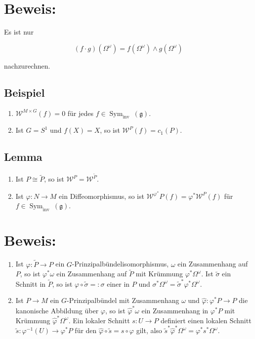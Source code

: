 \documentclass[10pt, letterpaper]{article}
\begin{document}
\section*{Beweis:}
Es ist nur

$$
(f \cdot g)\left(\Omega^{\omega}\right)=f\left(\Omega^{\omega}\right) \wedge g\left(\Omega^{\omega}\right)
$$

nachzurechnen.

\subsection*{Beispiel}
\begin{enumerate}
  \item $\mathcal{W}^{M \times G}(f)=0$ für jedes $f \in \operatorname{Sym}_{\text {inv }}(\mathfrak{g})$.
  \item Ist $G=S^{1}$ und $f(X)=X$, so ist $\mathcal{W}^{P}(f)=c_{1}(P)$.
\end{enumerate}

\subsection*{Lemma}
\begin{enumerate}
  \item Ist $P \cong \tilde{P}$, so ist $\mathcal{W}^{P}=\mathcal{W}^{\tilde{P}}$.
  \item Ist $\varphi: N \rightarrow M$ ein Diffeomorphismus, so ist $\mathcal{W}^{\varphi^{*}} P(f)=\varphi^{*} \mathcal{W}^{P}(f)$ für $f \in \operatorname{Sym}_{\text {inv }}(\mathfrak{g})$.
\end{enumerate}

\section*{Beweis:}
\begin{enumerate}
  \item Ist $\varphi: \tilde{P} \rightarrow P$ ein $G$-Prinzipalbündelisomorphismus, $\omega$ ein Zusammenhang auf $P$, so ist $\varphi^{*} \omega$ ein Zusammenhang auf $\tilde{P}$ mit Krümmung $\varphi^{*} \Omega^{\omega}$. Ist $\tilde{\sigma}$ ein Schnitt in $\tilde{P}$, so ist $\varphi \circ \tilde{\sigma}=: \sigma$ einer in $P$ und $\sigma^{*} \Omega^{\omega}=\tilde{\sigma}^{*} \varphi^{*} \Omega^{\omega}$.
  \item Ist $P \rightarrow M$ ein $G$-Prinzipalbündel mit Zusammenhang $\omega$ und $\hat{\varphi}: \varphi^{*} P \rightarrow P$ die kanonische Abbildung über $\varphi$, so ist $\hat{\varphi}^{*} \omega$ ein Zusammenhang in $\varphi^{*} P$ mit Krümmung $\hat{\varphi}^{*} \Omega^{\omega}$. Ein lokaler Schnitt $s: U \rightarrow P$ definiert einen lokalen Schnitt $\tilde{s}: \varphi^{-1}(U) \rightarrow \varphi^{*} P$ für den $\hat{\varphi} \circ \tilde{s}=s \circ \varphi$ gilt, also $\tilde{s}^{*} \hat{\varphi}^{*} \Omega^{\omega}=\varphi^{*} s^{*} \Omega^{\omega}$.
\end{enumerate}
\end{document}

